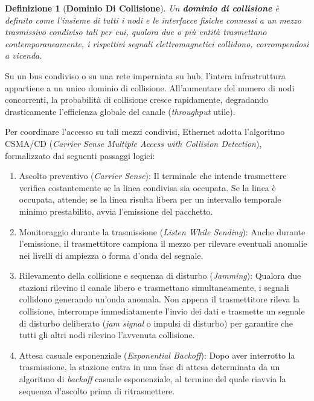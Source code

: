 \documentclass[11pt, a4paper]{article}
\newtheorem{theorem}{Definizione}
\begin{document}
\begin{theorem}[\textbf{Dominio Di Collisione}]
Un \textbf{dominio di collisione} è definito come l'insieme di tutti i nodi e le interfacce fisiche connessi a un mezzo trasmissivo condiviso tali per cui, qualora due o più entità trasmettano contemporaneamente, i rispettivi segnali elettromagnetici collidono, corrompendosi a vicenda.
\end{theorem}


Su un bus condiviso o su una rete imperniata su hub, l'intera infrastruttura appartiene a un unico dominio di collisione. All'aumentare del numero di nodi concorrenti, la probabilità di collisione cresce rapidamente, degradando drasticamente l'efficienza globale del canale (\emph{throughput} utile).

Per coordinare l'accesso su tali mezzi condivisi, Ethernet adotta l'algoritmo CSMA/CD (\emph{Carrier Sense Multiple Access with Collision Detection}), formalizzato dai seguenti passaggi logici:
\begin{enumerate}
    \item Ascolto preventivo (\emph{Carrier Sense}): Il terminale che intende trasmettere verifica costantemente se la linea condivisa sia occupata. Se la linea è occupata, attende; se la linea risulta libera per un intervallo temporale minimo prestabilito, avvia l'emissione del pacchetto.
    \item Monitoraggio durante la trasmissione (\emph{Listen While Sending}): Anche durante l'emissione, il trasmettitore campiona il mezzo per rilevare eventuali anomalie nei livelli di ampiezza o forma d'onda del segnale.
    \item Rilevamento della collisione e sequenza di disturbo (\emph{Jamming}): Qualora due stazioni rilevino il canale libero e trasmettano simultaneamente, i segnali collidono generando un'onda anomala. Non appena il trasmettitore rileva la collisione, interrompe immediatamente l'invio dei dati e trasmette un segnale di disturbo deliberato (\emph{jam signal} o impulsi di disturbo) per garantire che tutti gli altri nodi rilevino l'avvenuta collisione.
    \item Attesa casuale esponenziale (\emph{Exponential Backoff}): Dopo aver interrotto la trasmissione, la stazione entra in una fase di attesa determinata da un algoritmo di \emph{backoff} casuale esponenziale, al termine del quale riavvia la sequenza d'ascolto prima di ritrasmettere.
\end{enumerate}
\end{document}
